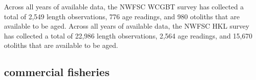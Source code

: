 \documentclass[11pt,
  english,
  letterpaper,
]{article}
\begin{document}
\leavevmode\tagmcend\tagstructend\par


Across all years of available data, the NWFSC WCGBT survey has collected a total of 2,549 length observations, 776 age readings, and 980 otoliths that are available to be aged. Across all years of available data, the NWFSC HKL survey has collected a total of 22,986 length observations, 2,564 age readings, and 15,670 otoliths that are available to be aged.

\leavevmode\tagmcend\tagstructend\par


\hypertarget{commercial-fisheries-56}{%
\subsection{commercial fisheries}\label{commercial-fisheries-56}}

\leavevmode\tagmcend\tagstructend


\begingroup\fontsize{10}{12}\selectfont \begingroup\fontsize{10}{12}\selectfont

\leavevmode\tagmcend\tagstructend\par
\end{document}
